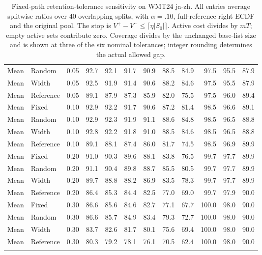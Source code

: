 \begin{table}[t]
\begin{tabular}{llrrrrrrrrrr}
Mean & Random & 0.05 & 92.7 & 92.1 & 91.7 & 90.9 & 88.5 & 84.9 & 97.5 & 95.5 & 87.9 \\
Mean & Width & 0.05 & 92.5 & 91.9 & 91.4 & 90.6 & 88.2 & 84.6 & 97.5 & 95.5 & 87.9 \\
Mean & Reference & 0.05 & 89.1 & 87.9 & 87.3 & 85.9 & 82.0 & 75.5 & 97.5 & 96.0 & 89.4 \\
\addlinespace
Mean & Fixed & 0.10 & 92.9 & 92.2 & 91.7 & 90.6 & 87.2 & 81.4 & 98.5 & 96.6 & 89.1 \\
Mean & Random & 0.10 & 92.9 & 92.3 & 91.9 & 91.1 & 88.6 & 84.8 & 98.5 & 96.5 & 88.8 \\
Mean & Width & 0.10 & 92.8 & 92.2 & 91.8 & 91.0 & 88.5 & 84.6 & 98.5 & 96.5 & 88.8 \\
Mean & Reference & 0.10 & 89.1 & 88.1 & 87.4 & 86.0 & 81.7 & 74.5 & 98.5 & 96.9 & 89.9 \\
\addlinespace
Mean & Fixed & 0.20 & 91.0 & 90.3 & 89.6 & 88.1 & 83.8 & 76.5 & 99.7 & 97.7 & 89.9 \\
Mean & Random & 0.20 & 91.1 & 90.4 & 89.8 & 88.7 & 85.5 & 80.5 & 99.7 & 97.7 & 89.9 \\
Mean & Width & 0.20 & 89.7 & 88.8 & 88.2 & 86.9 & 83.5 & 78.3 & 99.7 & 97.7 & 89.9 \\
Mean & Reference & 0.20 & 86.4 & 85.3 & 84.4 & 82.5 & 77.0 & 69.0 & 99.7 & 97.9 & 90.0 \\
\addlinespace
Mean & Fixed & 0.30 & 86.6 & 85.6 & 84.6 & 82.7 & 77.1 & 67.7 & 100.0 & 98.0 & 90.0 \\
Mean & Random & 0.30 & 86.6 & 85.7 & 84.9 & 83.4 & 79.3 & 72.7 & 100.0 & 98.0 & 90.0 \\
Mean & Width & 0.30 & 83.7 & 82.6 & 81.7 & 80.1 & 75.6 & 69.4 & 100.0 & 98.0 & 90.0 \\
Mean & Reference & 0.30 & 80.3 & 79.2 & 78.1 & 76.1 & 70.5 & 62.4 & 100.0 & 98.0 & 90.0 \\
\addlinespace
\bottomrule
\end{tabular}
\caption{Fixed-path retention-tolerance sensitivity on WMT24 ja-zh. All entries average splitwise ratios over 40 overlapping splits, with $\alpha=.10$, full-reference right ECDF and the original pool. The stop is $V^+-V^-\le\lceil\eta|S_0|\rceil$. Active cost divides by $mT$; empty active sets contribute zero. Coverage divides by the unchanged base-list size and is shown at three of the six nominal tolerances; integer rounding determines the actual allowed gap.}
\label{tab:tolerance-all-5}
\end{table}
